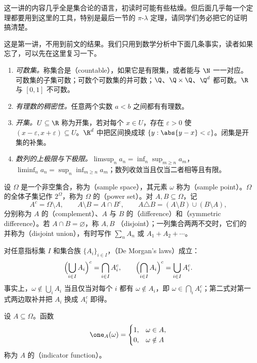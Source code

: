 这一讲的内容几乎全是集合论的语言，初读时可能有些枯燥。但后面几乎每一个定理都要用到这里的工具，特别是最后一节的 $\pi$-$\lambda$ 定理，请同学们务必把它的证明搞清楚。


这是第一讲，不用到前文的结果。我们只用到数学分析中下面几条事实，读者如果忘了，可以先在这里复习一下。
\begin{enumerate}
\item \emph{可数集。}称集合是（countable），如果它是有限集，或者能与 $\N$ 一一对应。可数集的子集可数；可数个可数集的并可数；$\Q$、$\Q\times\Q$、$\Q^d$ 都可数。$\R$ 与 $[0,1]$ 不可数。
\item \emph{有理数的稠密性。}任意两个实数 $a<b$ 之间都有有理数。
\item \emph{开集。}$U\subseteq\R$ 称为开集，若对每个 $x\in U$，存在 $\varepsilon>0$ 使 $(x-\varepsilon,x+\varepsilon)\subseteq U$。$\R^d$ 中把区间换成球 $\{y:\abs{y-x}<\varepsilon\}$。闭集是开集的补集。
\item \emph{数列的上极限与下极限。}$\limsup_na_n=\inf_n\sup_{m\geqslant n}a_m$，$\liminf_na_n=\sup_n\inf_{m\geqslant n}a_m$；数列收敛当且仅当二者相等且有限。
\end{enumerate}


设 $\Omega$ 是一个非空集合，称为（sample space），其元素 $\omega$ 称为（sample point）。$\Omega$ 的全体子集记作 $2^\Omega$，称为 $\Omega$ 的（power set）。对 $A,B\subseteq\Omega$，记
\[
A^c=\Omega\setminus A,\qquad A\setminus B=A\cap B^c,\qquad A\triangle B=(A\setminus B)\cup(B\setminus A),
\]
分别称为 $A$ 的（complement）、$A$ 与 $B$ 的（difference）和（symmetric difference）。若 $A\cap B=\varnothing$，称 $A,B$ （disjoint）；一列集合两两不交时，它们的并称为（disjoint union），有时写作 $\sum_n A_n$ 或 $A_1+A_2+\cdots$。

对任意指标集 $I$ 和集合族 $\{A_i\}_{i\in I}$，（De Morgan's laws）成立：
\[
\Bigl(\bigcup_{i\in I}A_i\Bigr)^c=\bigcap_{i\in I}A_i^c,\qquad \Bigl(\bigcap_{i\in I}A_i\Bigr)^c=\bigcup_{i\in I}A_i^c .
\]
事实上，$\omega\notin\bigcup_iA_i$ 当且仅当对每个 $i$ 都有 $\omega\notin A_i$，即 $\omega\in\bigcap_iA_i^c$；第二式对第一式两边取补并把 $A_i$ 换成 $A_i^c$ 即得。

\begin{definition}[示性函数]\label{def:set-systems:indicator}
设 $A\subseteq\Omega$。函数
\[
\one_A(\omega)=\begin{cases}1,&\omega\in A,\\0,&\omega\notin A\end{cases}
\]
称为 $A$ 的（indicator function）。
\end{definition}

